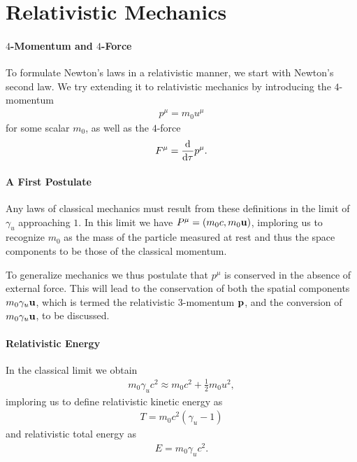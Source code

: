 \section{Relativistic Mechanics}

\paragraph{$4$-Momentum and $4$-Force}
To formulate Newton's laws in a relativistic manner, we start with Newton's second law. We try extending it to relativistic mechanics by introducing the $4$-momentum
\begin{align*}
	p^{\mu} = m_{0}u^{\mu}
\end{align*}
for some scalar $m_{0}$, as well as the $4$-force
\begin{align*}
	F^{\mu} = \dv{\tau}p^{\mu}.
\end{align*}

\paragraph{A First Postulate}
Any laws of classical mechanics must result from these definitions in the limit of $\gamma_{u}$ approaching $1$. In this limit we have $P^{\mu} = (m_{0}c, m_{0}\vb{u})$, imploring us to recognize $m_{0}$ as the mass of the particle measured at rest and thus the space components to be those of the classical momentum.

To generalize mechanics we thus postulate that $p^{\mu}$ is conserved in the absence of external force. This will lead to the conservation of both the spatial components $m_{0}\gamma_{u}\vb{u}$, which is termed the relativistic $3$-momentum $\vb{p}$, and the conversion of $m_{0}\gamma_{u}\vb{u}$, to be discussed.

\paragraph{Relativistic Energy}
In the classical limit we obtain
\begin{align*}
	m_{0}\gamma_{u}c^{2} \approx m_{0}c^{2} + \frac{1}{2}m_{0}u^{2},
\end{align*}
imploring us to define relativistic kinetic energy as
\begin{align*}
	T = m_{0}c^{2}(\gamma_{u} - 1)
\end{align*}
and relativistic total energy as
\begin{align*}
	E = m_{0}\gamma_{u}c^{2}.
\end{align*}

